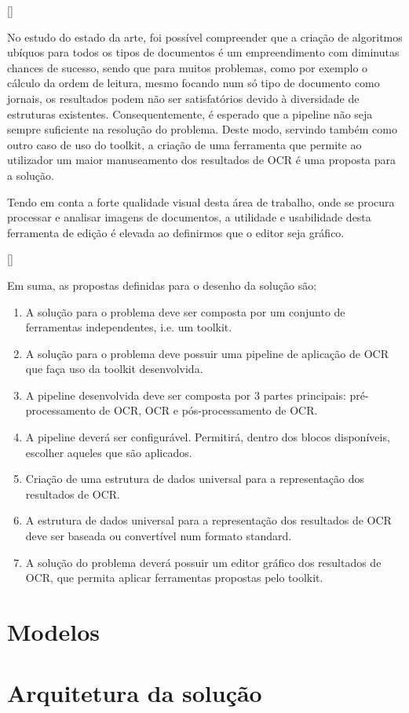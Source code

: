 [\normalsize]


No estudo do estado da arte, foi possível compreender que a criação de algoritmos ubíquos para todos os tipos de documentos é um empreendimento com diminutas chances de sucesso, sendo que para muitos problemas, como por exemplo o cálculo da ordem de leitura, mesmo focando num só tipo de documento como jornais, os resultados podem não ser satisfatórios devido à diversidade de estruturas existentes. Consequentemente, é esperado que a pipeline não seja sempre suficiente na resolução do problema. 
Deste modo, servindo também como outro caso de uso do toolkit, a criação de uma ferramenta que permite ao utilizador um maior manuseamento dos resultados de OCR é uma proposta para a solução. 

Tendo em conta a forte qualidade visual desta área de trabalho, onde se procura processar e analisar imagens de documentos, a utilidade e usabilidade desta ferramenta de edição é elevada ao definirmos que o editor seja gráfico.


[\normalsize]



Em suma, as propostas definidas para o desenho da solução são:

\begin{enumerate}[label=\textbf{\arabic*}]\setlength\itemsep{-0.8em}
	\item A solução para o problema deve ser composta por um conjunto de ferramentas independentes, i.e. um toolkit.
	\item A solução para o problema deve possuir uma pipeline de aplicação de OCR que faça uso da toolkit desenvolvida.
	\item A pipeline desenvolvida deve ser composta por 3 partes principais: pré-processamento de OCR, OCR e pós-processamento de OCR.
	\item A pipeline deverá ser configurável. Permitirá, dentro dos blocos disponíveis, escolher aqueles que são aplicados.
	\item Criação de uma estrutura de dados universal para a representação dos resultados de OCR.
	\item A estrutura de dados universal para a representação dos resultados de OCR deve ser baseada ou convertível num formato standard.
	\item A solução do problema deverá possuir um editor gráfico dos resultados de OCR, que permita aplicar ferramentas propostas pelo toolkit.
\end{enumerate}


\section{Modelos}

\section{Arquitetura da solução}